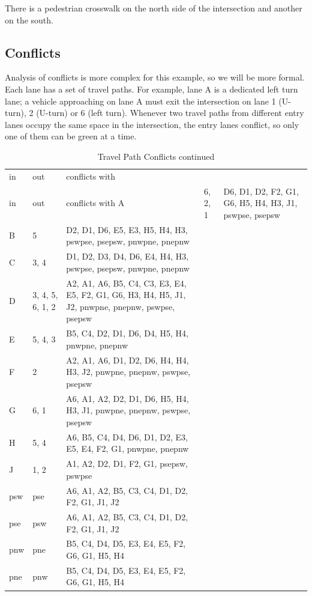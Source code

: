 \documentclass[letterpaper,twoside]{article}
\begin{document}
There is a pedestrian crosswalk on the north side of the intersection
and another on the south.

\subsection{Conflicts}

Analysis of conflicts is more complex for this example, so we
will be more formal.  Each lane has a set of travel paths.
For example, lane A is a dedicated left turn lane; a vehicle approaching on
lane A must exit the intersection on lane 1 (U-turn), 2 (U-turn)
or 6 (left turn).  Whenever two travel paths from different entry lanes
occupy the same space in the intersection, the entry lanes
conflict, so only one of them can be green at a time.

\begin{longtable}{l |l| p{8cm}}
  \caption{Travel Path Conflicts} \\
  in & out & conflicts with \endfirsthead
  \caption{Travel Path Conflicts continued} \\
  in & out & conflicts with \endhead
  \hline
  A & 6, 2, 1 & D6, D1, D2, F2, G1, G6, H5, H4, H3, J1, pswpse, psepsw \\
  B & 5 & D2, D1, D6, E5, E3, H5, H4, H3, pswpse, psepsw, pnwpne, pnepnw \\
  C & 3, 4 & D1, D2, D3, D4, D6, E4, H4, H3, pswpse, psepsw, pnwpne, pnepnw \\
  D & 3, 4, 5, 6, 1, 2 & A2, A1, A6, B5, C4, C3, E3, E4, E5, F2, G1, G6, H3,
  H4, H5, J1, J2, pnwpne, pnepnw, pswpse, psepsw \\
  E & 5, 4, 3 & B5, C4, D2, D1, D6, D4, H5, H4, pnwpne, pnepnw  \\
  F & 2 & A2, A1, A6, D1, D2, D6, H4, H4, H3, J2, pnwpne, pnepnw, pswpse,
  psepsw \\
  G & 6, 1 & A6, A1, A2, D2, D1, D6, H5, H4, H3, J1, pnwpne, pnepnw, pswpse,
  psepsw \\
  H & 5, 4 & A6, B5, C4, D4, D6, D1, D2, E3, E5, E4, F2, G1, pnwpne, pnepnw \\
  J & 1, 2 & A1, A2, D2, D1, F2, G1, psepsw, pswpse \\
  psw & pse & A6, A1, A2, B5, C3, C4, D1, D2, F2, G1, J1, J2 \\
  pse & psw & A6, A1, A2, B5, C3, C4, D1, D2, F2, G1, J1, J2 \\
  pnw & pne & B5, C4, D4, D5, E3, E4, E5, F2, G6, G1, H5, H4 \\
  pne & pnw & B5, C4, D4, D5, E3, E4, E5, F2, G6, G1, H5, H4 \\
\end{longtable}
\end{document}
